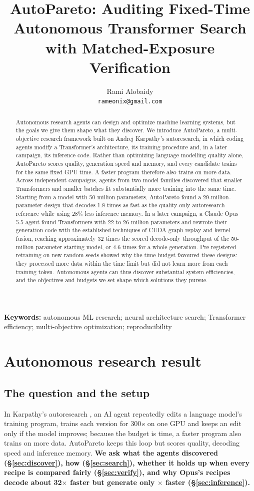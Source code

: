 \documentclass{article}
\title{AutoPareto: Auditing Fixed-Time Autonomous Transformer Search\\with Matched-Exposure Verification}
\author{Rami Alobaidy\\ \texttt{rameonix@gmail.com}}
\begin{document}
\maketitle
\begin{abstract}
Autonomous research agents can design and optimize machine learning systems, but the goals we give them shape what they discover. We introduce AutoPareto, a multi-objective research framework built on Andrej Karpathy's autoresearch, in which coding agents modify a Transformer's architecture, its training procedure and, in a later campaign, its inference code. Rather than optimizing language modelling quality alone, AutoPareto scores quality, generation speed and memory, and every candidate trains for the same fixed GPU time. A faster program therefore also trains on more data. Across independent campaigns, agents from two model families discovered that smaller Transformers and smaller batches fit substantially more training into the same time. Starting from a model with 50 million parameters, AutoPareto found a 29-million-parameter design that decodes 1.8 times as fast as the quality-only autoresearch reference while using 28\% less inference memory. In a later campaign, a Claude Opus 5.5 agent found Transformers with 22 to 26 million parameters and rewrote their generation code with the established techniques of CUDA graph replay and kernel fusion, reaching approximately 32 times the scored decode-only throughput of the 50-million-parameter starting model, or 4.6 times for a whole generation. Pre-registered retraining on new random seeds showed why the time budget favoured these designs: they processed more data within the time limit but did not learn more from each training token. Autonomous agents can thus discover substantial system efficiencies, and the objectives and budgets we set shape which solutions they pursue.
\end{abstract}

\noindent\textbf{Keywords:} autonomous ML research; neural architecture search; Transformer efficiency; multi-objective optimization; reproducibility

\section{Autonomous research result}\label{partone}

\subsection{The question and the setup}\label{sec:question}\label{sec:brief}
 In Karpathy's autoresearch \citep{autoresearch}, an AI agent repeatedly edits a language model's training program, trains each version for 300\,s on one GPU and keeps an edit only if the model improves; because the budget is time, a faster program also trains on more data. AutoPareto keeps this loop but scores quality, decoding speed and inference memory. \textbf{We ask what the agents discovered (\S\ref{sec:discover}), how (\S\ref{sec:search}), whether it holds up when every recipe is compared fairly (\S\ref{sec:verify}), and why Opus's recipes decode about 32$\times$ faster but generate only \CRSixEtoEXLo$\times$ faster (\S\ref{sec:inference}).}
\end{document}
